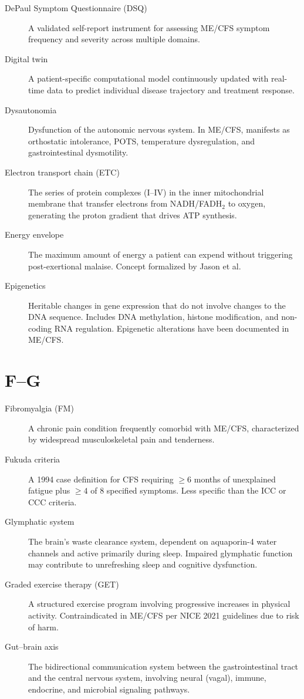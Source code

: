 \begin{description}
\item[DePaul Symptom Questionnaire (DSQ)] A validated self-report instrument for assessing ME/CFS symptom frequency and severity across multiple domains.
\item[Digital twin] A patient-specific computational model continuously updated with real-time data to predict individual disease trajectory and treatment response.
\item[Dysautonomia] Dysfunction of the autonomic nervous system. In ME/CFS, manifests as orthostatic intolerance, POTS, temperature dysregulation, and gastrointestinal dysmotility.
\item[Electron transport chain (ETC)] The series of protein complexes (I--IV) in the inner mitochondrial membrane that transfer electrons from NADH/FADH$_2$ to oxygen, generating the proton gradient that drives ATP synthesis.
\item[Energy envelope] The maximum amount of energy a patient can expend without triggering post-exertional malaise. Concept formalized by Jason et al.
\item[Epigenetics] Heritable changes in gene expression that do not involve changes to the DNA sequence. Includes DNA methylation, histone modification, and non-coding RNA regulation. Epigenetic alterations have been documented in ME/CFS.
\end{description}

\section*{F--G}

\begin{description}
\item[Fibromyalgia (FM)] A chronic pain condition frequently comorbid with ME/CFS, characterized by widespread musculoskeletal pain and tenderness.
\item[Fukuda criteria] A 1994 case definition for CFS requiring $\geq 6$ months of unexplained fatigue plus $\geq 4$ of 8 specified symptoms. Less specific than the ICC or CCC criteria.
\item[Glymphatic system] The brain's waste clearance system, dependent on aquaporin-4 water channels and active primarily during sleep. Impaired glymphatic function may contribute to unrefreshing sleep and cognitive dysfunction.
\item[Graded exercise therapy (GET)] A structured exercise program involving progressive increases in physical activity. Contraindicated in ME/CFS per NICE 2021 guidelines due to risk of harm.
\item[Gut--brain axis] The bidirectional communication system between the gastrointestinal tract and the central nervous system, involving neural (vagal), immune, endocrine, and microbial signaling pathways.
\end{description}


